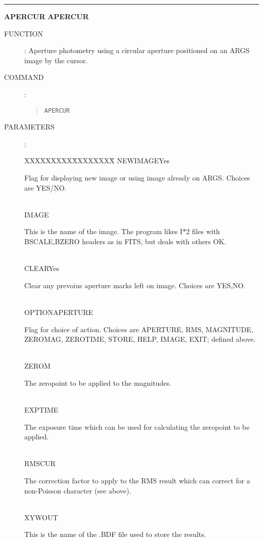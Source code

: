 \goodbreak
\rule{\textwidth}{0.3mm}
{\Large {\bf APERCUR} \hfill {\bf APERCUR}}
\begin{description}
\item [FUNCTION]:
Aperture photometry using a circular aperture positioned on an ARGS image by
the cursor.
\item [COMMAND]:
\begin{quote}
{\tt APERCUR}
\end{quote}
\item [PARAMETERS] :
\begin{tabbing}
XXXXXXXXX\=XXXXXXXX\=\kill
NEWIMAGE\>Yes\>\begin{minipage}[t]{100mm}
Flag for displaying new image or using image already on ARGS.
Choices are YES/NO.
\end{minipage}\\
IMAGE\>\>\begin{minipage}[t]{100mm}
This is the name of the image.
The program likes I*2 files with BSCALE,BZERO headers as in FITS, but deals with
others OK.
\end{minipage}\\
CLEAR\>Yes\>\begin{minipage}[t]{100mm}
Clear any prevoius aperture marks left on image.
Choices are YES,NO.
\end{minipage}\\
OPTION\>APERTURE\>\begin{minipage}[t]{100mm}
Flag for choice of action.
Choices are APERTURE, RMS, MAGNITUDE, ZEROMAG, ZEROTIME, STORE, HELP, IMAGE,
EXIT; defined above.
\end{minipage}\\
ZEROM\>\begin{minipage}[t]{100mm}
The zeropoint to be applied to the magnitudes.
\end{minipage}\\
EXPTIME\>\begin{minipage}[t]{100mm}
The exposure time which can be used for calculating the zeropoint to be
applied.
\end{minipage}\\
RMSCUR\>\begin{minipage}[t]{100mm}
The correction factor to apply to the RMS result which can correct for a
non-Poisson character (see above).
\end{minipage}\\
XYWOUT\>\>\begin{minipage}[t]{100mm}
This is the name of the .BDF file used to store the results.

\end{minipage}
\end{tabbing}
\end{description}
